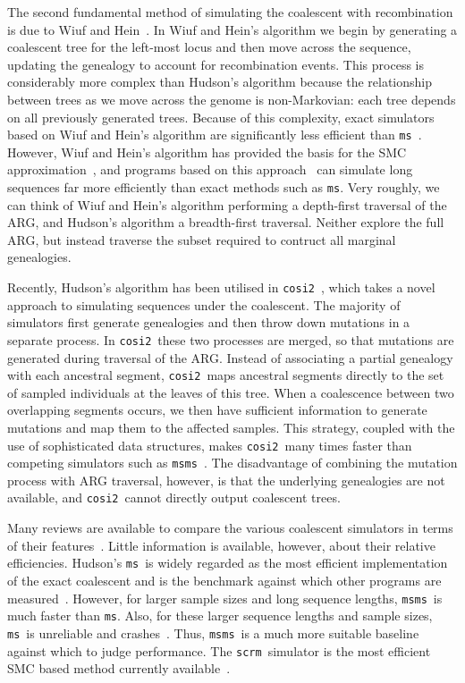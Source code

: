 \documentclass[10pt,letterpaper]{article}
\newcommand{\ms}[0]{\texttt{ms}}
\newcommand{\msms}[0]{\texttt{msms}}
\newcommand{\scrm}[0]{\texttt{scrm}}
\newcommand{\cosi}[0]{\texttt{cosi2}}
\begin{document}
The second fundamental method of simulating the coalescent with recombination
is due to Wiuf and Hein~\citep{wh99}. In Wiuf and Hein's algorithm we begin by generating a
coalescent tree for the left-most locus and then move across the sequence,
updating the genealogy to account for recombination events. This process is
considerably more complex than Hudson's algorithm because the relationship
between trees as we move across the genome is non-Markovian: each tree depends
on all previously generated trees. Because of this complexity, exact simulators
based on Wiuf and Hein's algorithm are significantly less efficient than
\ms~\citep{szml14,wzlclmx14}. However, Wiuf and Hein's algorithm has provided the
basis for the SMC approximation~\citep{mc05,mw06}, and programs based on
this approach~\citep{cmw09,ef11,szml14} can simulate long sequences far more
efficiently than exact methods such as \ms. Very roughly, we can think of
Wiuf and Hein's algorithm performing a depth-first traversal of the ARG, and
Hudson's algorithm a breadth-first traversal. Neither explore the full ARG,
but instead traverse the subset required to contruct all marginal genealogies.

Recently, Hudson's algorithm has been utilised in \cosi~\citep{sss14}, which
takes a novel approach to simulating sequences under the coalescent. The
majority of simulators first generate genealogies and then throw down mutations
in a separate process. In \cosi\ these two processes are merged, so that
mutations are generated during traversal of the ARG. Instead of associating a
partial genealogy with each ancestral segment, \cosi\ maps ancestral segments
directly to the set of sampled individuals at the leaves of this tree. When a
coalescence between two overlapping segments occurs, we then have sufficient
information to generate mutations and map them to the affected samples. This
strategy, coupled with the use of sophisticated data structures, makes \cosi\
many times faster than competing simulators such as \msms~\citep{eh10}.
The disadvantage of
combining the mutation process with ARG traversal, however, is that the
underlying genealogies are not available, and \cosi\ cannot directly output
coalescent trees.

Many reviews are available to compare the various coalescent simulators in
terms of their features~\citep{c08,law08,a12,ymzhw12,hbg12,ydn14}. Little
information is available, however, about their relative efficiencies.
Hudson's \ms\ is widely regarded as the most efficient implementation of
the exact coalescent and is the benchmark against which other programs are
measured~\citep{mw06,cmw09,ef11,szml14,ydn14,wzlclmx14}. However,
for larger sample sizes and long sequence lengths, \msms\
is much faster than \ms. Also, for these larger sequence lengths and sample
sizes, \ms\ is unreliable and crashes~\citep{ef11,ydn14}. Thus,
\msms\ is a much more suitable baseline against which to judge performance.
The \scrm\ simulator is the most efficient SMC based
method currently available~\citep{szml14}.
\end{document}
